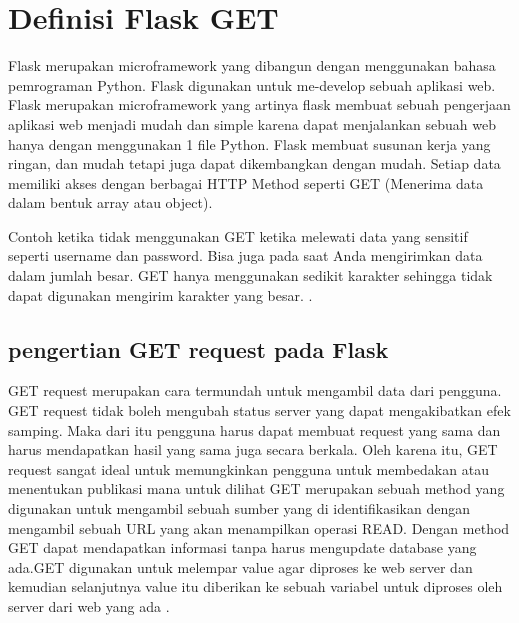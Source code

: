 
\section{Definisi Flask GET}
Flask merupakan microframework yang dibangun dengan menggunakan bahasa pemrograman Python. Flask digunakan untuk me-develop sebuah aplikasi web. Flask merupakan microframework yang artinya flask membuat sebuah pengerjaan aplikasi web menjadi mudah dan simple karena dapat menjalankan sebuah web hanya dengan menggunakan 1 file Python. Flask membuat susunan kerja yang ringan, dan mudah tetapi juga dapat dikembangkan dengan mudah. Setiap data memiliki akses dengan berbagai HTTP Method seperti GET (Menerima data dalam bentuk array atau object).

 Contoh ketika tidak menggunakan GET ketika melewati data yang sensitif seperti username dan password. Bisa juga pada saat Anda mengirimkan data dalam jumlah besar. GET hanya menggunakan sedikit karakter sehingga tidak dapat digunakan mengirim karakter yang besar. \cite{gunawan2018aplikasi}.
\subsection{pengertian GET request pada Flask}
GET request merupakan cara termundah untuk mengambil data dari pengguna. GET request tidak boleh mengubah status server yang dapat mengakibatkan efek samping.  Maka dari itu pengguna harus dapat membuat request yang sama dan harus mendapatkan hasil yang sama juga secara berkala. Oleh karena itu, GET request sangat ideal untuk memungkinkan pengguna untuk membedakan atau menentukan publikasi mana untuk dilihat\cite{dwyer2016flask}
GET merupakan sebuah method yang digunakan untuk mengambil sebuah sumber yang di identifikasikan dengan mengambil sebuah URL yang akan menampilkan operasi READ. Dengan method GET dapat mendapatkan informasi tanpa harus mengupdate database yang ada.GET digunakan untuk melempar value agar diproses ke web server dan kemudian selanjutnya value itu diberikan ke sebuah variabel untuk diproses oleh server dari web yang ada \cite{alemu2014rest}.
